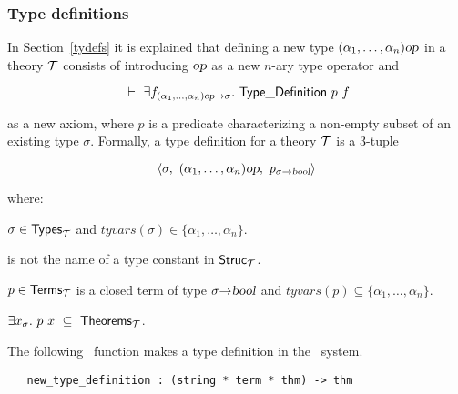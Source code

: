 \subsubsection{Type definitions}
\label{type-defs}

In Section~\ref{tydefs} it is explained that
defining
a new type $(\alpha_1,\ldots,\alpha_n)\textsl{op}$ in a theory ${\cal T}$ consists
of introducing $\textsl{op}$ as a new $n$-ary type operator and

\[\turn \equant{f_{(\alpha_1,\ldots,\alpha_n)\ty{op}\fun\sigma}}\TyDef\ p\ f\]

\noindent as a new axiom, where $p$ is a predicate
characterizing a
non-empty subset of an existing type $\sigma$.  Formally, a type definition
for a theory ${\cal T}$ is a $3$-tuple

\[ \langle \sigma,\ (\alpha_1,\ldots,\alpha_n)\ty{op},
    \ p_{\sigma\fun\ty{bool}}\rangle \]

\noindent where:

\begin{myenumerate}
\item $\sigma\in{\sf Types}_{\cal T}$  and
$tyvars(\sigma)\in\{\alpha_1, \ldots , \alpha_n\}$.
\item {} is not the name of a type constant in ${\sf Struc}_{\cal T}$.
\item $p\in{\sf Terms}_{\cal T}$ is a closed term of
type $\sigma{\to}\textsl{bool}$  and
$tyvars(p)\subseteq\{\alpha_1, \ldots , \alpha_n\}$.
\item $\exists x_{\sigma}.\ p\ x \ \subseteq\ {\sf Theorems}_{\cal T}$.
\end{myenumerate}

The following \ML\ function makes a type definition in the \HOL\ system.

\begin{boxed}
\begin{verbatim}
   new_type_definition : (string * term * thm) -> thm
\end{verbatim}\end{boxed}

